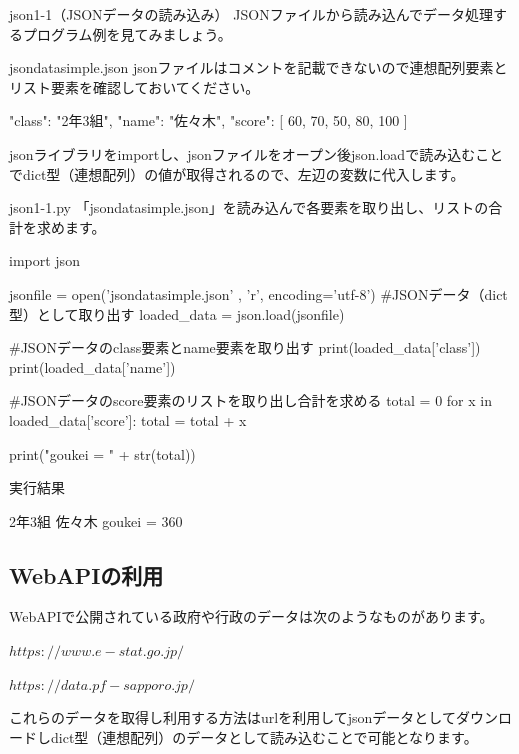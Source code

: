 \begin{pabox}{json1-1（JSONデータの読み込み）}
JSONファイルから読み込んでデータ処理するプログラム例を見てみましょう。
\begin{legbox}{jsondatasimple.json}
jsonファイルはコメントを記載できないので連想配列要素とリスト要素を確認しておいてください。
\begin{listing}{1}
{
    "class": "2年3組",
    "name": "佐々木",
    "score": [
        60,
        70,
        50,
        80,
        100
    ]
}
\end{listing}
\end{legbox}
jsonライブラリをimportし、jsonファイルをオープン後json.loadで読み込むことでdict型（連想配列）の値が取得されるので、左辺の変数に代入します。
\begin{legbox}{json1-1.py}
「jsondatasimple.json」を読み込んで各要素を取り出し、リストの合計を求めます。
\begin{listing}{1}
import json

jsonfile = open('jsondatasimple.json' , 'r', encoding='utf-8') 
#JSONデータ（dict型）として取り出す
loaded_data = json.load(jsonfile)  

#JSONデータのclass要素とname要素を取り出す
print(loaded_data['class'])
print(loaded_data['name'])

#JSONデータのscore要素のリストを取り出し合計を求める
total = 0
for x in loaded_data['score']:
    total = total + x

print("goukei = " + str(total))
\end{listing}
実行結果
\begin{listing}{1}
2年3組
佐々木
goukei = 360
\end{listing}

\end{legbox}
\end{pabox}

\subsection{WebAPIの利用}


WebAPIで公開されている政府や行政のデータは次のようなものがあります。

\begin{description}
	\item $https://www.e-stat.go.jp/$
	\item $https://data.pf-sapporo.jp/$
\end{description}

これらのデータを取得し利用する方法はurlを利用してjsonデータとしてダウンロードしdict型（連想配列）のデータとして読み込むことで可能となります。

